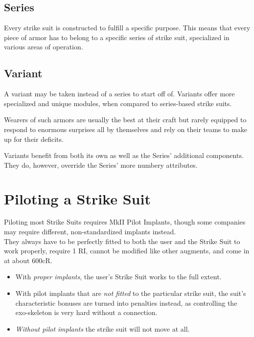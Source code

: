 \documentclass[12pt,a4paper,openany,usenames,dvipsnames]{book}
\begin{document}
	\section{Series}
	Every strike suit is constructed to fulfill a specific purpose. This means that every piece of armor has to belong to a specific series of strike suit, specialized in various areas of operation.
	
    \begin{multicols}{2}
    	\raggedcolumns
    \end{multicols}
    
    \pagebreak
    \section{Variant}
    A variant may be taken instead of a series to start off of. Variants offer more specialized and unique modules, when compared to series-based strike suits.
    \par
    Wearers of such armors are usually the best at their craft but rarely equipped to respond to enormous surprises all by themselves and rely on their teams to make up for their deficits.
    \par
    Variants benefit from both its own as well as the Series' additional components.
    They do, however, override the Series' more numbery attributes.
    \par
    
    \begin{multicols}{2}
    	\raggedcolumns
    \end{multicols}
    
    \chapter{Piloting a Strike Suit}
    Piloting most Strike Suits requires MkII Pilot Implants, though some companies may require different, non-standardized implants instead.\\
    They always have to be perfectly fitted to both the user and the Strike Suit to work properly, require 1 RI, cannot be modified like other augments, and come in at about 600cR.\\
    \begin{itemize}
    	\item With \emph{proper implants}, the user's Strike Suit works to the full extent.
    	\item With pilot implants that are \emph{not fitted} to the particular strike suit, the suit's characteristic bonuses are turned into penalties instead, as controlling the exo-skeleton is very hard without a connection.
    	\item \emph{Without pilot implants} the strike suit will not move at all.
    \end{itemize}
    
\end{document}
